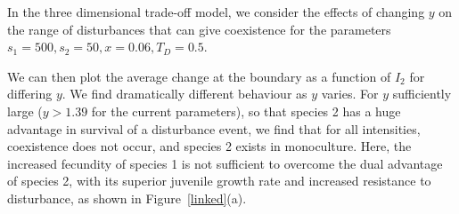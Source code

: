 In the three dimensional trade-off model, we consider the effects of changing $y$ on the range of disturbances that can give coexistence for the parameters $s_1=500,s_2=50,x=0.06,T_D=0.5$.

We can then plot the average change at the boundary as a function of $I_2$ for differing $y$. We find dramatically different behaviour as $y$ varies. For $y$ sufficiently large ($y>1.39$ for the current parameters), so that species 2 has a huge advantage in survival of a disturbance event, we find that for all intensities, coexistence does not occur, and species 2 exists in monoculture. Here, the increased fecundity of species 1 is not sufficient to overcome the dual advantage of species 2, with its superior juvenile growth rate and increased resistance to disturbance, as shown in Figure~\ref{linked}(a).

